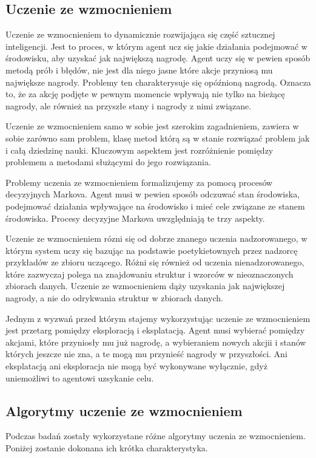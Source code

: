 \subsection{Uczenie ze wzmocnieniem}
Uczenie ze wzmocnieniem to dynamicznie rozwijająca się część sztucznej inteligencji.
Jest to proces, w którym agent ucz się jakie działania podejmować w środowisku, 
aby uzyskać jak największą nagrodę. Agent uczy się w pewien sposób metodą prób i błędów,
nie jest dla niego jasne które akcje przyniosą mu największe nagrody. Problemy ten 
charakterysuje się opóźnioną nagrodą. Oznacza to, że za akcję podjęte w pewnym momencie 
wpływają nie tylko na bieżącę nagrody, ale również na przyszłe stany i nagrody z nimi związane.

Uczenie ze wzmocnieniem samo w sobie jest szerokim zagadnieniem, zawiera w sobie zarówno sam problem,
klasę metod którą są w stanie rozwiązać problem jak i całą dziedzinę nauki. Kluczowym aspektem 
jest rozróżnienie pomiędzy problemem a metodami służącymi do jego rozwiązania.

Problemy uczenia ze wzmocnieniem formalizujemy za pomocą procesów decyzyjnych Markova.
Agent musi w pewien sposób odczuwać stan środowiska, podejmować działania wpływające na środowisko 
i mieć cele związane ze stanem środowiska. Procesy decyzyjne Markova uwzględniają te trzy aspekty.

Uczenie ze wzmocnieniem rózni się od dobrze znanego uczenia nadzorowanego, w którym system uczy 
się bazując na podstawie poetykietownych przez nadzorcę przykładów ze zbioru uczącego.
Różni się również od uczenia nienadzorowanego, które zazwyczaj polega na znajdowaniu 
struktur i wzorców w nieoznaczonych zbiorach danych. Uczenie ze wzmocnieniem dąży 
uzyskania jak największej nagrody, a nie do odrykwania struktur w zbiorach danych.

Jednym z wyzwań przed którym stajemy wykorzystując uczenie ze wzmocnieniem jest przetarg 
pomiędzy eksploracją i eksplatacją. Agent musi wybierać pomiędzy akcjami, które przyniosły mu już 
nagrodę, a wybieraniem nowych akcjii i stanów których jeszcze nie zna, a te mogą mu przynieść 
nagrody w przyszłości. Ani eksplatacją ani eksploracja nie mogą być wykonywane wyłącznie,
gdyż uniemożliwi to agentowi uzsykanie celu.

\subsection{Algorytmy uczenie ze wzmocnieniem}
Podczas badań zostały wykorzystane różne algorytmy uczenia ze wzmocnieniem. Poniżej zostanie dokonana
ich krótka charakterystyka.

